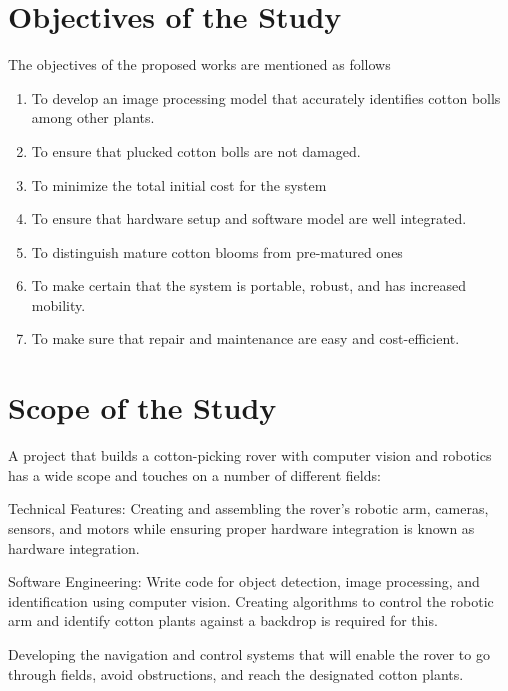 \documentclass[12pt,a4paper]{report}
\begin{document}

\section{Objectives of the Study}
\par The objectives of the proposed works are mentioned as follows
\begin{enumerate}
    \item To develop an image processing model that accurately identifies cotton bolls among other plants.
   \item To ensure that plucked cotton bolls are not damaged.
   \item To minimize the total initial cost for the system
   \item To ensure that hardware setup and software model are well integrated.
   \item To distinguish mature cotton blooms from pre-matured ones
   \item To make certain that the system is portable, robust, and has increased mobility.
   \item To make sure that repair and maintenance are easy and cost-efficient. 
\end{enumerate}




\section {Scope of the Study}
\par A project that builds a cotton-picking rover with computer vision and robotics has a wide scope and touches on a number of different fields:
\par Technical Features: Creating and assembling the rover's robotic arm, cameras, sensors, and motors while ensuring proper hardware integration is known as hardware integration.
\par Software Engineering: Write code for object detection, image processing, and identification using computer vision. Creating algorithms to control the robotic arm and identify cotton plants against a backdrop is required for this.
\par Developing the navigation and control systems that will enable the rover to go through fields, avoid obstructions, and reach the designated cotton plants.
\end{document}
